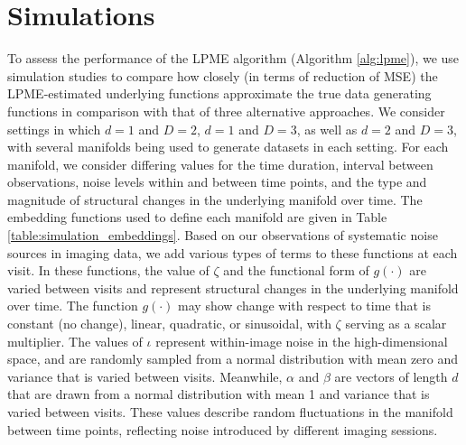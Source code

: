 \documentclass[12pt]{article}
\theoremstyle{definition}
\begin{document}
\section{Simulations}\label{s:simulations}

To assess the performance of the LPME algorithm (Algorithm \ref{alg:lpme}), we use simulation studies to compare how closely (in terms of reduction of MSE) the LPME-estimated underlying functions approximate the true data generating functions in comparison with that of three alternative approaches. We consider settings in which $d = 1$ and $D = 2$, $d = 1$ and $D = 3$, as well as $d = 2$ and $D = 3$, with several manifolds being used to generate datasets in each setting. For each manifold, we consider differing values for the time duration, interval between observations, noise levels within and between time points, and the type and magnitude of structural changes in the underlying manifold over time. The embedding functions used to define each manifold are given in Table \ref{table:simulation_embeddings}. Based on our observations of systematic noise sources in imaging data, we add various types of terms to these functions at each visit. In these functions, the value of $\zeta$ and the functional form of $g(\cdot)$ are varied between visits and represent structural changes in the underlying manifold over time. The function $g(\cdot)$ may show change with respect to time that is constant (no change), linear, quadratic, or sinusoidal, with $\zeta$ serving as a scalar multiplier. The values of $\iota$ represent within-image noise in the high-dimensional space, and are randomly sampled from a normal distribution with mean zero and variance that is varied between visits. Meanwhile, $\alpha$ and $\beta$ are vectors of length $d$ that are drawn from a normal distribution with mean 1 and variance that is varied between visits. These values describe random fluctuations in the manifold between time points, reflecting noise introduced by different imaging sessions.
\end{document}
